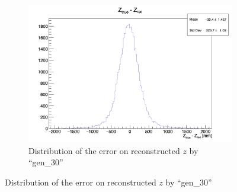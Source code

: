 \begin{figure}[ht]
\begin{subfigure}[t]{0.32\linewidth}
    \includegraphics[width=\linewidth]{images/jcnn/vic_cnn/cnn_delta_z.png}
    \caption{Distribution of the error on reconstructed $z$ by ``gen\_30''}
    \label{fig:jcnn:vic_cnn:cnn_delta_z}
  \end{subfigure}



\end{figure}
